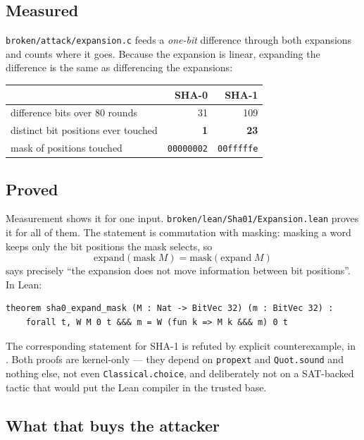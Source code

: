 \documentclass[11pt,a4paper]{article}
\newcommand{\shazero}{\textcolor{sha0col}{SHA-0}}
\newcommand{\shaone}{\textcolor{sha1col}{SHA-1}}
\begin{document}
\subsection{Measured}\label{sec:measured-spread}

\texttt{broken/attack/expansion.c} feeds a \emph{one-bit} difference through
both expansions and counts where it goes. Because the expansion is linear,
expanding the difference is the same as differencing the expansions:

\begin{center}
\begin{tabular}{lrr}
\toprule
 & \shazero & \shaone \\
\midrule
difference bits over 80 rounds & 31 & 109 \\
distinct bit positions ever touched & \textbf{1} & \textbf{23} \\
mask of positions touched & \texttt{00000002} & \texttt{00fffffe} \\
\bottomrule
\end{tabular}
\end{center}

\subsection{Proved}\label{sec:proved}

Measurement shows it for one input. \texttt{broken/lean/Sha01/Expansion.lean}
proves it for all of them. The statement is commutation with masking: masking
a word keeps only the bit positions the mask selects, so
%
\[
  \mathrm{expand}(\mathrm{mask}\;M) = \mathrm{mask}(\mathrm{expand}\;M)
\]
%
says precisely ``the expansion does not move information between bit
positions''. In Lean:

\begin{lstlisting}
theorem sha0_expand_mask (M : Nat -> BitVec 32) (m : BitVec 32) :
    forall t, W M 0 t &&& m = W (fun k => M k &&& m) 0 t
\end{lstlisting}

\noindent
The corresponding statement for SHA-1 is refuted by explicit counterexample,
in . Both proofs are kernel-only
--- they depend on \texttt{propext} and \texttt{Quot.sound} and nothing else,
not even \texttt{Classical.choice}, and deliberately not on a SAT-backed
tactic that would put the Lean compiler in the trusted base.

\subsection{What that buys the attacker}\label{sec:buys}
\end{document}
